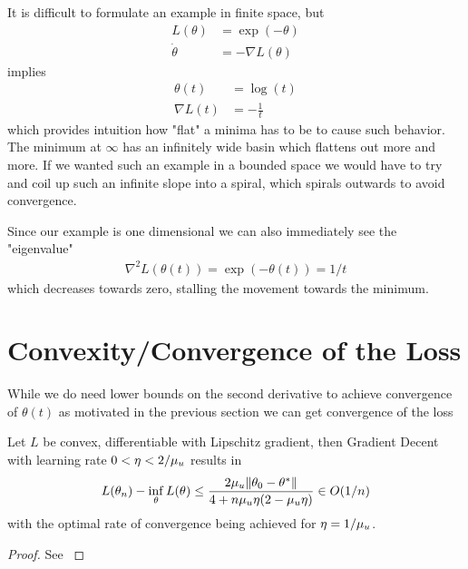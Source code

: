It is difficult to formulate an example in finite space, but
%
\begin{align*}
	L(\theta) &= \exp(-\theta) \\
	\dot{\theta} &= -\nabla L(\theta)
\end{align*}
%
implies
%
\begin{align*}
	\theta(t) &= \log(t)\\
	\nabla L(t) &= -\tfrac1t
\end{align*}
%
which provides intuition how "flat" a minima has to be to cause such behavior.
The minimum at \(\infty\) has an infinitely wide basin which flattens out
more and more. If we wanted such an example in a bounded space we would have
to try and coil up such an infinite slope into a spiral, which spirals outwards
to avoid convergence.

Since our example is one dimensional we can also immediately see the "eigenvalue"
%
\begin{align*}
	\nabla^2 L(\theta(t)) = \exp(-\theta(t)) = 1/t
\end{align*}
%
which decreases towards zero, stalling the movement towards the minimum.

\section{Convexity/Convergence of the Loss}

While we do need lower bounds on the second derivative to achieve convergence
of \(\theta(t)\) as motivated in the previous section we can get convergence
of the loss

\begin{theorem}
	Let \(L\) be convex, differentiable with Lipschitz gradient, then Gradient
	Decent with learning rate \(0 < \eta < 2/\mu_u\) results in
	\begin{align*}
		L(\theta_n) - \inf_\theta L(\theta)
		\le \frac{2\mu_u\|\theta_0 - \theta^*\|}{4 + n\mu_u\eta(2-\mu_u\eta)}
		\in O(1/n)
	\end{align*}
	with the optimal rate of convergence being achieved for \(\eta=1/\mu_u\).
\end{theorem}
\begin{proof}
	See \textcite[Theorem 2.1.14, Corollary
	2.1.2]{nesterovLecturesConvexOptimization2018}
\end{proof}

